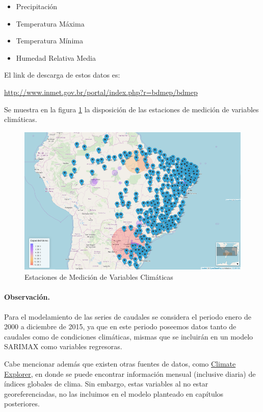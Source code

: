 \documentclass[12pt,oneside]{book}\usepackage[]{graphicx}\usepackage[]{color}
\theoremstyle{definition} %
\begin{document}
\begin{enumerate}
\begin{itemize}


\item Precipitación
\item Temperatura Máxima
\item Temperatura Mínima
\item Humedad Relativa Media


\end{itemize}

El link de descarga de estos datos es:

\url{http://www.inmet.gov.br/portal/index.php?r=bdmep/bdmep}


Se muestra en la figura \ref{fig:mapa_clm} la disposición de las estaciones de medición de variables climáticas.


\begin{figure}[H]
	\centering
	\includegraphics[scale=0.5]{map_estacClm}
	\caption{Estaciones de Medición de Variables Climáticas}\label{fig:mapa_clm}
\end{figure}

\end{enumerate}

\paragraph{Observación.} Para el modelamiento de las series de caudales se considera el periodo enero de 2000 a diciembre de 2015, ya que en este periodo poseemos datos tanto de caudales como de condiciones climáticas, mismas que se incluirán en un modelo SARIMAX como variables regresoras.

Cabe mencionar además que existen otras fuentes de datos, como \href{http://climexp.knmi.nl/start.cgi?id=someone@somewhere}{Climate Explorer}, en donde se puede encontrar información mensual (inclusive diaria) de índices globales de clima. Sin embargo, estas variables al no estar georeferenciadas, no las incluimos en el modelo planteado en capítulos posteriores.
\end{document}
